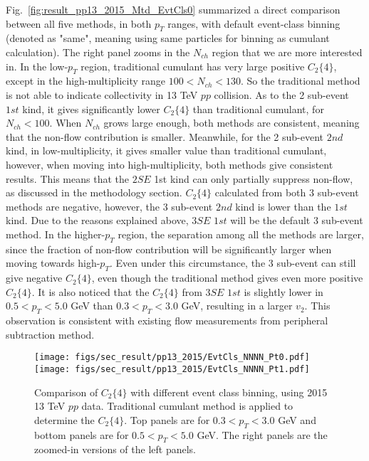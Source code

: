 Fig.~\ref{fig:result_pp13_2015_Mtd_EvtCls0} summarized a direct comparison between all five methods, in both $p_{T}$ ranges, with default event-class binning (denoted as "same", meaning using same particles for binning as cumulant calculation). The right panel zooms in the $N_{ch}$ region that we are more interested in. In the low-$p_{T}$ region, traditional cumulant has very large positive $C_{2}\{4\}$, except in the high-multiplicity range $100<N_{ch}<130$. So the traditional method is not able to indicate collectivity in 13 TeV $pp$ collision. As to the 2 sub-event $1st$ kind, it gives significantly lower $C_{2}\{4\}$ than traditional cumulant, for $N_{ch}<100$. When $N_{ch}$ grows large enough, both methods are consistent, meaning that the non-flow contribution is smaller. Meanwhile, for the 2 sub-event $2nd$ kind, in low-multiplicity, it gives smaller value than traditional cumulant, however, when moving into high-multiplicity, both methods give consistent results. This means that the $2SE$ 1st kind can only partially suppress non-flow, as discussed in the methodology section. $C_{2}\{4\}$ calculated from both 3 sub-event methods are negative, however, the 3 sub-event $2nd$ kind is lower than the $1st$ kind. Due to the reasons explained above, $3SE$ $1st$ will be the default 3 sub-event method. In the higher-$p_{T}$ region, the separation among all the methods are larger, since the fraction of non-flow contribution will be significantly larger when moving towards high-$p_{T}$. Even under this circumstance, the 3 sub-event can still give negative $C_{2}\{4\}$, even though the traditional method gives even more positive $C_{2}\{4\}$. It is also noticed that the $C_{2}\{4\}$ from $3SE$ $1st$ is slightly lower in $0.5<p_{T}<5.0$ GeV than $0.3<p_{T}<3.0$ GeV, resulting in a larger $v_{2}$. This observation is consistent with existing flow measurements from peripheral subtraction method.

\begin{figure}[H]
\centering
\texttt{[image: figs/sec\_result/pp13\_2015/EvtCls\_NNNN\_Pt0.pdf]}
\texttt{[image: figs/sec\_result/pp13\_2015/EvtCls\_NNNN\_Pt1.pdf]}
\caption{Comparison of $C_{2}\{4\}$ with different event class binning, using 2015 13 TeV $pp$ data. Traditional cumulant method is applied to determine the $C_{2}\{4\}$. Top panels are for $0.3<p_{T}<3.0$ GeV and bottom panels are for $0.5<p_{T}<5.0$ GeV. The right panels are the zoomed-in versions of the left panels.}
\label{fig:result_pp13_2015_EvtCls_NNNN}
\end{figure}

